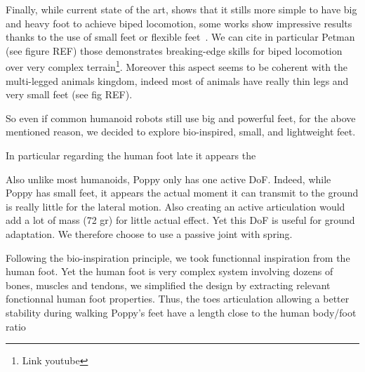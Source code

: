 Finally, while current state of the art, shows that it stills more simple to have big and heavy foot\cite{REF} to achieve biped locomotion, some works show impressive results thanks to the use of small feet or flexible feet~\cite{bruneau2001dynamic}. We can cite in particular Petman (see figure REF) those demonstrates breaking-edge skills for biped locomotion over very complex terrain\footnote{Link youtube}.
Moreover this aspect seems to be coherent with the multi-legged animals kingdom, indeed most of animals have really thin legs and very small feet (see fig REF).

So even if common humanoid robots still use big and powerful feet, for the above mentioned reason, we decided to explore bio-inspired, small, and lightweight feet.

In particular regarding the human foot late it appears the

Also unlike most humanoids, Poppy only has one active DoF. Indeed, while Poppy has small feet, it appears the actual moment it can transmit to the ground is really little for the lateral motion. Also creating an active articulation would add a lot of mass (72 gr) for little actual effect. Yet this DoF is useful for ground adaptation. We therefore choose to use a passive joint with spring.

Following the bio-inspiration principle, we took functionnal inspiration from the human foot. Yet the human foot is very complex system involving dozens of bones, muscles and tendons, we simplified the design by extracting relevant fonctionnal human foot properties. Thus, the toes articulation allowing a better stability during walking
Poppy's feet have a length close to the human body/foot ratio



